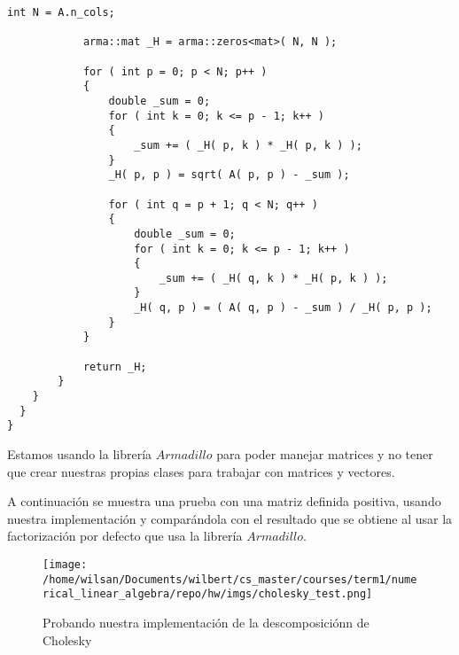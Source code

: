 \documentclass{article}
\begin{document}
\begin{enumerate}
\begin{lstlisting}[frame=single]
            int N = A.n_cols;

            arma::mat _H = arma::zeros<mat>( N, N );

            for ( int p = 0; p < N; p++ )
            {
                double _sum = 0;
                for ( int k = 0; k <= p - 1; k++ )
                {
                    _sum += ( _H( p, k ) * _H( p, k ) );
                }
                _H( p, p ) = sqrt( A( p, p ) - _sum );

                for ( int q = p + 1; q < N; q++ )
                {
                    double _sum = 0;
                    for ( int k = 0; k <= p - 1; k++ )
                    {
                        _sum += ( _H( q, k ) * _H( p, k ) );
                    }
                    _H( q, p ) = ( A( q, p ) - _sum ) / _H( p, p );
                }
            }

            return _H;
        }
    }
  }
}
\end{lstlisting}
Estamos usando la librer\'ia $Armadillo$ para poder manejar matrices y no tener que crear nuestras propias clases para trabajar con matrices y vectores.

A continuaci\'on se muestra una prueba con una matriz definida positiva, usando nuestra implementaci\'on y compar\'andola con el resultado que se obtiene al usar la factorizaci\'on por defecto que usa la librer\'ia $Armadillo$.

\begin{figure}[H]
	\centering
	\texttt{[image: /home/wilsan/Documents/wilbert/cs\_master/courses/term1/numerical\_linear\_algebra/repo/hw/imgs/cholesky\_test.png]}
	\caption{Probando nuestra implementaci\'on de la descomposici\'onn de Cholesky}
	\label{fig:img_pecc}
\end{figure}




\end{enumerate}
\end{document}
